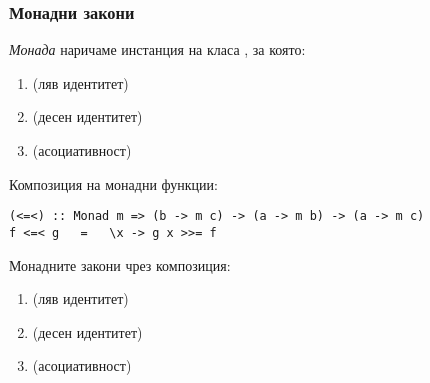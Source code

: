 \documentclass[alsotrans,beameroptions={aspectratio=169}]{beamerswitch}
\begin{document}
\begin{frame}[fragile]
  \frametitle{Монадни закони}
  \begin{definition}
    \emph{Монада} наричаме инстанция на класа , за която:
    \begin{enumerate}[<+->]
    \item {} \eqv {} (ляв идентитет)
    \item {}   \eqv {}   (десен идентитет)
    \item {} \eqv {} (асоциативност)
    \end{enumerate}
  \end{definition}
  \onslide<+->
  Композиция на монадни функции:
\begin{lstlisting}
(<=<) :: Monad m => (b -> m c) -> (a -> m b) -> (a -> m c)  
f <=< g   =   \x -> g x >>= f
\end{lstlisting}
  \onslide<+->
  \vspace{-.5ex}
  Монадните закони чрез композиция:
  \begin{enumerate}
  \item {} \eqv {} (ляв идентитет)
  \item {} \eqv {} (десен идентитет)
  \item {} \eqv {} (асоциативност)
  \end{enumerate}
\end{frame}
\end{document}
